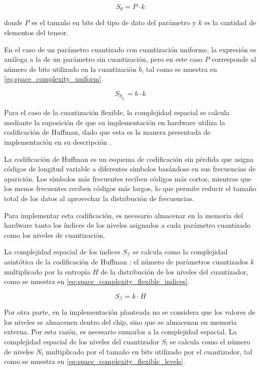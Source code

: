 \begin{equation}
  \label{eq:space_complexity_no_quantized}
    S_{\theta} = P \cdot k
\end{equation}

donde $P$ es el tamaño en bits del tipo de dato del parámetro y $k$ es la cantidad de elementos del tensor.

En el caso de un parámetro cuantizado con cuantización uniforme, la expresión es análoga a la de un parámetro sin cuantización, pero en este caso $P$ corresponde al número de bits utilizado en la cuantización $b$, tal como se muestra en \eqref{eq:space_complexity_uniform}.

\begin{equation}
  \label{eq:space_complexity_uniform}
    S_{\theta_{q_{u}}} = b \cdot k
\end{equation}

Para el caso de la cuantización flexible, la complejidad espacial se calcula mediante la suposición de que su implementación en hardware utiliza la codificación de Huffman, dado que esta es la manera presentada de implementación en su descripción \cite{electronics13101923}.

La codificación de Huffman es un esquema de codificación sin pérdida que asigna códigos de longitud variable a diferentes símbolos basándose en sus frecuencias de aparición. Los símbolos más frecuentes reciben códigos más cortos, mientras que los menos frecuentes reciben códigos más largos, lo que permite reducir el tamaño total de los datos al aprovechar la distribución de frecuencias.

Para implementar esta codificación, es necesario almacenar en la memoria del hardware tanto los índices de los niveles asignados a cada parámetro cuantizado como los niveles de cuantización.

La complejidad espacial de los índices $S_{\mathcal{I}}$ se calcula como la complejidad asintótica de la codificación de Huffman \cite{huffman1952method}: el número de parámetros cuantizados $k$ multiplicado por la entropía $H$ de la distribución de los niveles del cuantizador, como se muestra en \eqref{eq:space_complexity_flexible_indices}.

\begin{equation}
  \label{eq:space_complexity_flexible_indices}
    S_{\mathcal{I}} = k \cdot H
\end{equation}

Por otra parte, en la implementación planteada no se considera que los valores de los niveles se almacenen dentro del chip, sino que se almacenan en memoria externa. Por esta razón, es necesario sumarlos a la complejidad espacial. La complejidad espacial de los niveles del cuantizador $S_{l}$ se calcula como el número de niveles $N_{l}$ multiplicado por el tamaño en bits utilizado por el cuantizador, tal como se muestra en \eqref{eq:space_complexity_flexible_levels}.

